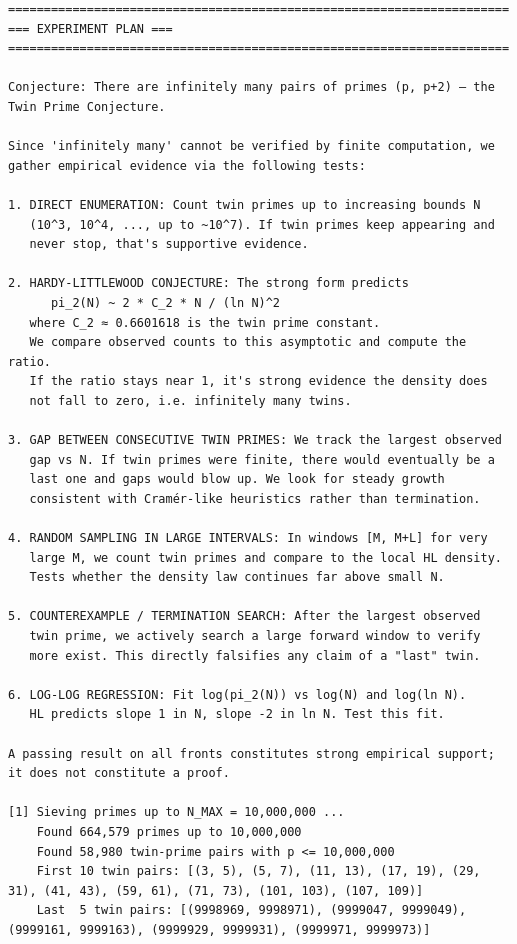 \documentclass[11pt]{article}
\begin{document}
\begin{lstlisting}
======================================================================
=== EXPERIMENT PLAN ===
======================================================================

Conjecture: There are infinitely many pairs of primes (p, p+2) — the
Twin Prime Conjecture.

Since 'infinitely many' cannot be verified by finite computation, we
gather empirical evidence via the following tests:

1. DIRECT ENUMERATION: Count twin primes up to increasing bounds N
   (10^3, 10^4, ..., up to ~10^7). If twin primes keep appearing and
   never stop, that's supportive evidence.

2. HARDY-LITTLEWOOD CONJECTURE: The strong form predicts
      pi_2(N) ~ 2 * C_2 * N / (ln N)^2
   where C_2 ≈ 0.6601618 is the twin prime constant.
   We compare observed counts to this asymptotic and compute the ratio.
   If the ratio stays near 1, it's strong evidence the density does
   not fall to zero, i.e. infinitely many twins.

3. GAP BETWEEN CONSECUTIVE TWIN PRIMES: We track the largest observed
   gap vs N. If twin primes were finite, there would eventually be a
   last one and gaps would blow up. We look for steady growth
   consistent with Cramér-like heuristics rather than termination.

4. RANDOM SAMPLING IN LARGE INTERVALS: In windows [M, M+L] for very
   large M, we count twin primes and compare to the local HL density.
   Tests whether the density law continues far above small N.

5. COUNTEREXAMPLE / TERMINATION SEARCH: After the largest observed
   twin prime, we actively search a large forward window to verify
   more exist. This directly falsifies any claim of a "last" twin.

6. LOG-LOG REGRESSION: Fit log(pi_2(N)) vs log(N) and log(ln N).
   HL predicts slope 1 in N, slope -2 in ln N. Test this fit.

A passing result on all fronts constitutes strong empirical support;
it does not constitute a proof.

[1] Sieving primes up to N_MAX = 10,000,000 ...
    Found 664,579 primes up to 10,000,000
    Found 58,980 twin-prime pairs with p <= 10,000,000
    First 10 twin pairs: [(3, 5), (5, 7), (11, 13), (17, 19), (29, 31), (41, 43), (59, 61), (71, 73), (101, 103), (107, 109)]
    Last  5 twin pairs: [(9998969, 9998971), (9999047, 9999049), (9999161, 9999163), (9999929, 9999931), (9999971, 9999973)]


\end{lstlisting}
\end{document}
